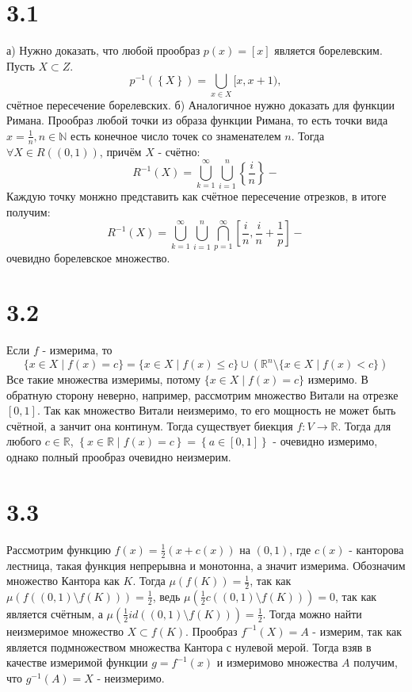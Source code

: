 \documentclass[12pt]{article}
\begin{document}
\section{3.1}
а) Нужно доказать, что любой прообраз $p(x) = [x]$ является борелевским. 
Пусть $X \subset Z$.
\[
    p^{-1}(\left\{ X \right\}) = \bigcup_{x \in X} [x, x + 1), 
\]
счётное пересечение борелевских. 
б) Аналогичное нужно доказать для функции Римана. Прообраз любой точки из образа функции Римана, то есть 
точки вида $x = \frac{1}{n}, n \in \mathbb{N}$ есть конечное число точек со знаменателем $n$. 
Тогда $\forall X \in R((0, 1))$, причём $X$ - счётно: 
\[
    R^{-1}(X) = \bigcup_{k=1}^{\infty} \bigcup_{i=1}^{n} \left\{ \frac{i}{n} \right\} - 
\]   
Каждую точку монжно представить как счётное пересечение отрезков, в итоге получим: 
\[
    R^{-1}(X) = \bigcup_{k=1}^{\infty} \bigcup_{i=1}^{n} \bigcap_{p=1}^{\infty} \left[ \frac{i}{n}, \frac{i}{n} + \frac{1}{p} \right]   - 
\] 
очевидно борелевское множество.

\section{3.2}
Если $f$ - измерима, то 
\[
    \{x \in X \mid f(x) = c\} = \{x \in X \mid f(x) \leq c\} \cup \left( \mathbb{R}^n \setminus \{x \in X \mid f(x) < c\} \right) 
\]  
Все такие множества измеримы, потому $\{x \in X \mid f(x) = c\}$ измеримо. 
В обратную сторону неверно, например, рассмотрим множество Витали на отрезке $[0, 1]$. Так как 
множество Витали неизмеримо, то его мощность не может быть счётной, а занчит она континум. 
Тогда существует биекция $f:V \to \mathbb{R}$. Тогда для любого $c \in \mathbb{R}$, 
$\left\{ x \in \mathbb{R} \mid f(x) = c\right\} = \left\{ a \in [0, 1] \right\}$ - очевидно измеримо, 
однако полный прообраз очевидно неизмерим. 
\section{3.3}
Рассмотрим функцию $f(x) = \frac{1}{2} (x + c(x))$ на $(0, 1)$, где $c(x)$ - канторова лестница, такая функция 
непрерывна и монотонна, а значит измерима. Обозначим 
множество Кантора как $K$. Тогда $\mu (f(K)) = \frac{1}{2}$, так как $\mu(f((0, 1) \setminus f(K))) = \frac{1}{2}$, ведь 
$\mu(\frac{1}{2}c((0, 1) \setminus f(K))) = 0$, так как является счётным, а $\mu(\frac{1}{2}id((0, 1) \setminus f(K))) = \frac{1}{2}$. 
Тогда можно найти неизмеримое множество $X \subset f(K)$. 
Прообраз $f^{-1}(X) = A$ - измерим, так как является подмножеством множества Кантора с нулевой мерой. 
Тогда взяв в качестве измеримой функции $g = f^{-1}(x)$ и измеримово множества $A$ получим, что 
$g^{-1}(A) = X$ - неизмеримо.  
\end{document}
